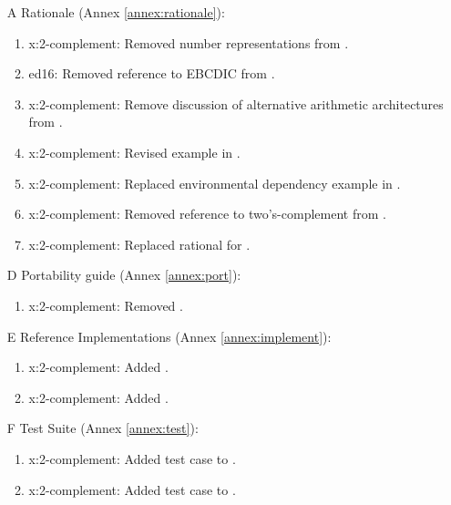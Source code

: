 \begin{itemize}
	\item[A] Rationale (Annex \ref{annex:rationale}):				%
		\begin{enumerate}
		\item \textsf{x:2-complement}: Removed number representations from .
		\item \textsf{ed16}: Removed reference to EBCDIC from .
		\item \textsf{x:2-complement}: Remove discussion of alternative arithmetic architectures from .
		\item \textsf{x:2-complement}: Revised example in .
		\item \textsf{x:2-complement}: Replaced environmental dependency example in  .
		\item \textsf{x:2-complement}: Removed reference
			to two's-complement from .
		\item \textsf{x:2-complement}:
		Replaced rational for .
		\end{enumerate}

	\item[D] Portability guide (Annex \ref{annex:port}):				%
		\begin{enumerate}
		\item \textsf{x:2-complement}: Removed .
		\end{enumerate}

	\item[E] Reference Implementations (Annex \ref{annex:implement}):	%
		\begin{enumerate}
		\item \textsf{x:2-complement}: Added .
		\item \textsf{x:2-complement}: Added .
		\end{enumerate}

	\item[F] Test Suite (Annex \ref{annex:test}):						%
		\begin{enumerate}
		\item \textsf{x:2-complement}: Added test case to .
		\item \textsf{x:2-complement}: Added test case to .
		\end{enumerate}
	\end{itemize}


\endinput

